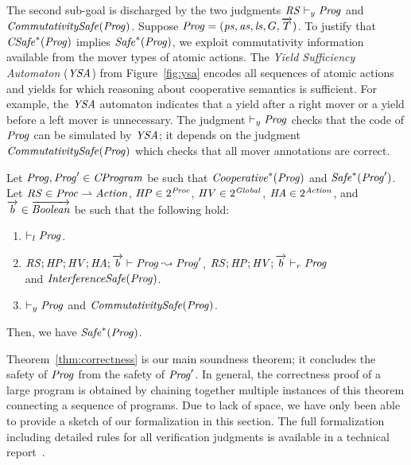 The second sub-goal is discharged by the two judgments $\mathit{RS} \vdash_y \mathit{Prog}$ and $\mathit{CommutativitySafe}(\mathit{Prog})$.
Suppose $\mathit{Prog} = (\mathit{ps}, \mathit{as}, \mathit{ls}, G, \overrightarrow{T})$.
To justify that $\mathit{CSafe}^*(\mathit{Prog})$ implies $\mathit{Safe}^*(\mathit{Prog})$,
we exploit commutativity information available from the mover types of atomic actions.
The {\em Yield Sufficiency Automaton\/} ($\mathit{YSA}$) from Figure~\ref{fig:ysa} encodes 
all sequences of atomic actions and yields for which reasoning about cooperative semantics is sufficient.
For example, the $\mathit{YSA}$ automaton indicates that a yield after a right mover or a yield before a left mover is unnecessary.
The judgment $\vdash_y \mathit{Prog}$ checks that the code of $\mathit{Prog}$ can be simulated by $\mathit{YSA}$;
it depends on the judgment $\mathit{CommutativitySafe}(\mathit{Prog})$ which checks that all mover annotations are correct.

\begin{theorem}
\label{thm:correctness}
Let $\mathit{Prog},\mathit{Prog}' \in \mathit{CProgram}$ be such that $\mathit{Cooperative}^*(\mathit{Prog})$ and $\mathit{Safe}^*(\mathit{Prog}')$.
Let $\mathit{RS} \in \mathit{Proc} \rightharpoonup \mathit{Action}$, $\mathit{HP} \in 2^{\mathit{Proc}}$, 
$\mathit{HV} \in 2^{\mathit{Global}}$, $\mathit{HA} \in 2^{\mathit{Action}}$,
and $\overrightarrow{b} \in \overrightarrow{\mathit{Boolean}}$ be such that the following hold:
\begin{enumerate}
\item
$\vdash_l \mathit{Prog}$.
\item
$\mathit{RS};\mathit{HP};\mathit{HV};\mathit{HA};\overrightarrow{b} \vdash \mathit{Prog} \leadsto \mathit{Prog}'$,
$\mathit{RS};\mathit{HP};\mathit{HV};\overrightarrow{b} \vdash_r \mathit{Prog}$ \\ and $\mathit{InterferenceSafe}(\mathit{Prog})$.
\item
$\vdash_y \mathit{Prog}$ and $\mathit{CommutativitySafe}(\mathit{Prog})$.
\end{enumerate}
Then, we have $\mathit{Safe}^*(\mathit{Prog})$.
\end{theorem}

Theorem~\ref{thm:correctness} is our main soundness theorem;
it concludes the safety of $\mathit{Prog}$ from the safety of $\mathit{Prog}'$.
In general, the correctness proof of a large program is obtained by chaining together
multiple instances of this theorem connecting a sequence of programs.  
Due to lack of space, we have only been able to provide a sketch of our formalization in this section.
The full formalization including detailed rules for all verification judgments is available in a technical report~\cite{gc-techreport}.
